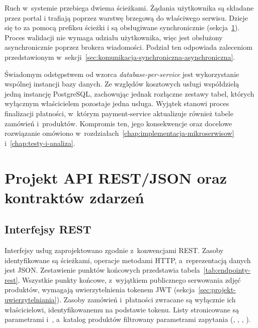 Ruch w~systemie przebiega dwiema ścieżkami. Żądania użytkownika są składane przez portal i trafiają poprzez
warstwę brzegową do właściwego serwisu. Dzieje się to za pomocą prefiksu ścieżki i są obsługiwane synchronicznie (sekcja~\ref{sec:projekt-api-i-zdarzen}).
Proces walidacji nie wymaga udziału użytkownika, więc jest obsłużony asynchronicznie poprzez brokera wiadomości.
Podział ten odpowiada zaleceniom przedstawionym w~sekcji~\ref{sec:komunikacja-synchroniczna-asynchroniczna}.

Świadomym odstępstwem od wzorca \emph{database-per-service} jest wykorzystanie wspólnej instancji bazy danych.
Ze względów kosztowych usługi współdzielą jedną instancję PostgreSQL, zachowując jednak rozłączne zestawy tabel,
których wyłącznym właścicielem pozostaje jedna usługa. Wyjątek stanowi proces finalizacji płatności, w~którym
payment-service aktualizuje również tabele zamówień i~produktów. Kompromis ten, jego konsekwencje
oraz docelowe rozwiązanie omówiono w~rozdziałach~\ref{chap:implementacja-mikroserwisow} i~\ref{chap:testy-i-analiza}.

\section{Projekt API REST/JSON oraz kontraktów zdarzeń}
\label{sec:projekt-api-i-zdarzen}

\subsection{Interfejsy REST}
\label{subsec:interfejsy-rest}

Interfejsy usług zaprojektowano zgodnie z~konwencjami REST. Zasoby identyfikowane są ścieżkami, operacje metodami
HTTP, a~reprezentacją danych jest JSON. Zestawienie punktów końcowych przedstawia
tabela~\ref{tab:endpointy-rest}. Wszystkie punkty końcowe, z~wyjątkiem publicznego serwowania zdjęć
produktów, wymagają uwierzytelnienia tokenem JWT (sekcja~\ref{sec:projekt-uwierzytelniania}). Zasoby zamówień
i~płatności zwracane są wyłącznie ich właścicielowi, identyfikowanemu na podstawie tokenu. Listy stronicowane są
parametrami  i~, a~katalog produktów filtrowany parametrami zapytania
(, , , ).

